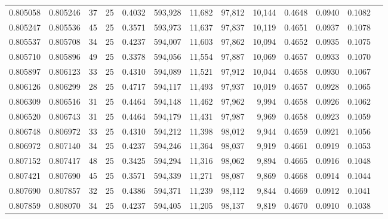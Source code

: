 \begin{tabular}{rrrrrrrrrrrrr}
0.805058 & 0.805246 &    37 &  25 &                                     0.4032 & 593,928 &  11,682 &  97,812 &  10,144 & 0.4648 & 0.0940 & 0.1082 \\
0.805247 & 0.805536 &    45 &  25 &                                     0.3571 & 593,973 &  11,637 &  97,837 &  10,119 & 0.4651 & 0.0937 & 0.1078 \\
0.805537 & 0.805708 &    34 &  25 &                                     0.4237 & 594,007 &  11,603 &  97,862 &  10,094 & 0.4652 & 0.0935 & 0.1075 \\
0.805710 & 0.805896 &    49 &  25 &                                     0.3378 & 594,056 &  11,554 &  97,887 &  10,069 & 0.4657 & 0.0933 & 0.1070 \\
0.805897 & 0.806123 &    33 &  25 &                                     0.4310 & 594,089 &  11,521 &  97,912 &  10,044 & 0.4658 & 0.0930 & 0.1067 \\
0.806126 & 0.806299 &    28 &  25 &                                     0.4717 & 594,117 &  11,493 &  97,937 &  10,019 & 0.4657 & 0.0928 & 0.1065 \\
0.806309 & 0.806516 &    31 &  25 &                                     0.4464 & 594,148 &  11,462 &  97,962 &   9,994 & 0.4658 & 0.0926 & 0.1062 \\
0.806520 & 0.806743 &    31 &  25 &                                     0.4464 & 594,179 &  11,431 &  97,987 &   9,969 & 0.4658 & 0.0923 & 0.1059 \\
0.806748 & 0.806972 &    33 &  25 &                                     0.4310 & 594,212 &  11,398 &  98,012 &   9,944 & 0.4659 & 0.0921 & 0.1056 \\
0.806972 & 0.807140 &    34 &  25 &                                     0.4237 & 594,246 &  11,364 &  98,037 &   9,919 & 0.4661 & 0.0919 & 0.1053 \\
0.807152 & 0.807417 &    48 &  25 &                                     0.3425 & 594,294 &  11,316 &  98,062 &   9,894 & 0.4665 & 0.0916 & 0.1048 \\
0.807421 & 0.807690 &    45 &  25 &                                     0.3571 & 594,339 &  11,271 &  98,087 &   9,869 & 0.4668 & 0.0914 & 0.1044 \\
0.807690 & 0.807857 &    32 &  25 &                                     0.4386 & 594,371 &  11,239 &  98,112 &   9,844 & 0.4669 & 0.0912 & 0.1041 \\
0.807859 & 0.808070 &    34 &  25 &                                     0.4237 & 594,405 &  11,205 &  98,137 &   9,819 & 0.4670 & 0.0910 & 0.1038 \\

\end{tabular}
